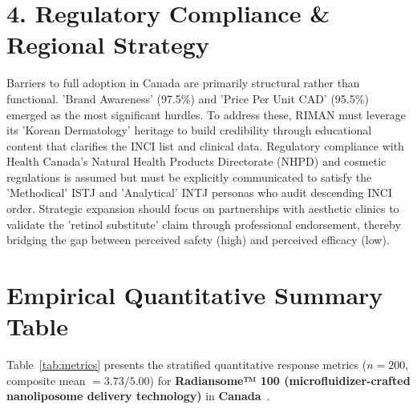 \documentclass[10pt,twocolumn,a4paper]{article}
\begin{document}
\section{4. Regulatory Compliance \& Regional Strategy}
Barriers to full adoption in Canada are primarily structural rather than functional. 'Brand Awareness' (97.5\%) and 'Price Per Unit CAD' (95.5\%) emerged as the most significant hurdles. To address these, RIMAN must leverage its 'Korean Dermatology' heritage to build credibility through educational content that clarifies the INCI list and clinical data. Regulatory compliance with Health Canada’s Natural Health Products Directorate (NHPD) and cosmetic regulations is assumed but must be explicitly communicated to satisfy the 'Methodical' ISTJ and 'Analytical' INTJ personas who audit descending INCI order. Strategic expansion should focus on partnerships with aesthetic clinics to validate the 'retinol substitute' claim through professional endorsement, thereby bridging the gap between perceived safety (high) and perceived efficacy (low).


\section{Empirical Quantitative Summary Table}
Table~\ref{tab:metrics} presents the stratified quantitative response metrics ($n = 200$, composite mean $= 3.73/5.00$) for \textbf{Radiansome™ 100 (microfluidizer-crafted nanoliposome delivery technology)} in \textbf{Canada}~\cite{ref_kaggle_doi,ref_hf_doi}.
\end{document}
